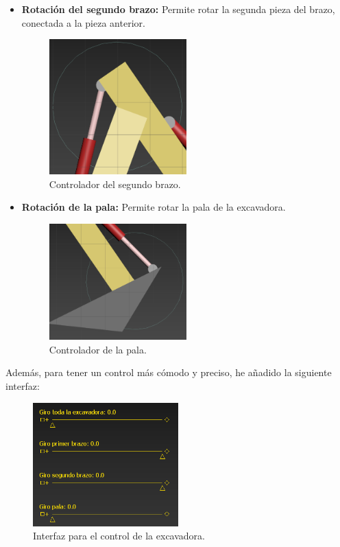 \begin{itemize}
    \item \textbf{Rotación del segundo brazo: }Permite rotar la segunda pieza del brazo, conectada a la pieza anterior.
    
    \begin{figure}[H]
        \centering
        \includegraphics[width=0.5\textwidth]{imagenes/brazo2control.png}
        \caption{Controlador del segundo brazo.}
     \end{figure}    

     \newpage

    \item \textbf{Rotación de la pala: }Permite rotar la pala de la excavadora.
    \begin{figure}[H]
        \centering
        \includegraphics[width=0.5\textwidth]{imagenes/palacontrol.png}
        \caption{Controlador de la pala.}
     \end{figure}        
\end{itemize}

\bigskip

Además, para tener un control más cómodo y preciso, he añadido la siguiente interfaz:

\begin{figure}[H]
    \centering
    \includegraphics[width=0.5\textwidth]{imagenes/sliders.png}
    \caption{Interfaz para el control de la excavadora.}
 \end{figure}
 

